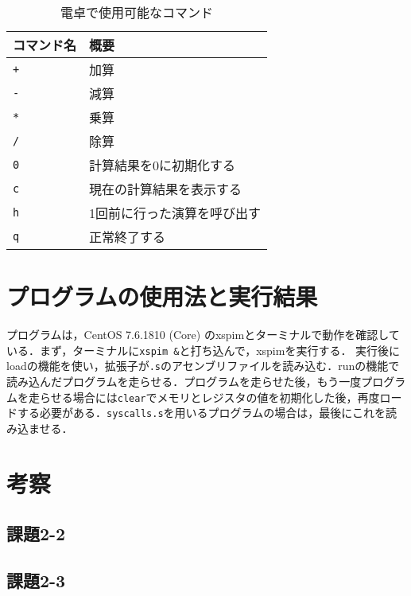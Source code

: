 \begin{table}[b]
\centering
	\caption{電卓で使用可能なコマンド}
	\label{tab:commands}
    	\begin{tabular}{|l|l|}
	\hline
コマンド名&概要\\
	\hline
\verb|+|&加算\\
	\hline
\verb|-|&減算\\
	\hline
\verb|*|&乗算\\
	\hline
\verb|/|&除算\\
	\hline
\verb|0|&計算結果を0に初期化する\\
	\hline
\verb|c|&現在の計算結果を表示する\\
	\hline
\verb|h|&1回前に行った演算を呼び出す\\
	\hline
\verb|q|&正常終了する\\
	\hline

	\end{tabular}
\end{table}


\section{プログラムの使用法と実行結果}\label{sec:howresult}

プログラムは，CentOS 7.6.1810 (Core) のxspimとターミナルで動作を確認している．まず，ターミナルに\verb|xspim &|と打ち込んで，xspimを実行する．
実行後にloadの機能を使い，拡張子が\verb|.s|のアセンブリファイルを読み込む．runの機能で読み込んだプログラムを走らせる．プログラムを走らせた後，もう一度プログラムを走らせる場合には\verb|clear|でメモリとレジスタの値を初期化した後，再度ロードする必要がある．\verb|syscalls.s|を用いるプログラムの場合は，最後にこれを読み込ませる．



\section{考察} \label{sec:review}

\subsection{課題2-2}

\subsection{課題2-3}

